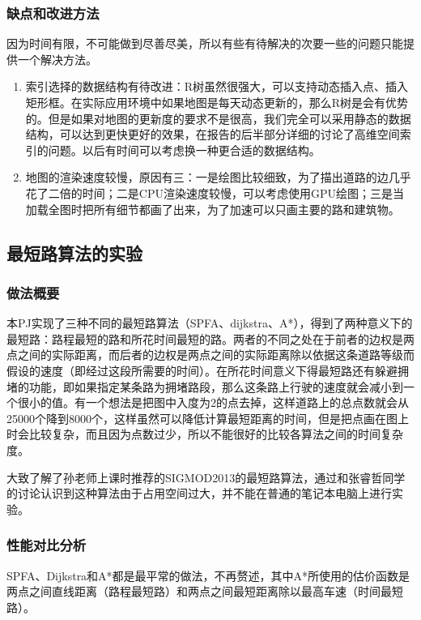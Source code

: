 \documentclass[10pt]{scrartcl}
\begin{document}
\subsubsection{缺点和改进方法}
因为时间有限，不可能做到尽善尽美，所以有些有待解决的次要一些的问题只能提供一个解决方法。
\begin{enumerate}
\item 索引选择的数据结构有待改进：R树虽然很强大，可以支持动态插入点、插入矩形框。在实际应用环境中如果地图是每天动态更新的，那么R树是会有优势的。但是如果对地图的更新度的要求不是很高，我们完全可以采用静态的数据结构，可以达到更快更好的效果，在报告的后半部分详细的讨论了高维空间索引的问题。以后有时间可以考虑换一种更合适的数据结构。
\item 地图的渲染速度较慢，原因有三：一是绘图比较细致，为了描出道路的边几乎花了二倍的时间；二是CPU渲染速度较慢，可以考虑使用GPU绘图；三是当加载全图时把所有细节都画了出来，为了加速可以只画主要的路和建筑物。
\end{enumerate}

\subsection{最短路算法的实验}
\subsubsection{做法概要}

本PJ实现了三种不同的最短路算法（SPFA、dijkstra、A*），得到了两种意义下的最短路：路程最短的路和所花时间最短的路。两者的不同之处在于前者的边权是两点之间的实际距离，而后者的边权是两点之间的实际距离除以依据这条道路等级而假设的速度（即经过这段所需要的时间）。在所花时间意义下得最短路还有躲避拥堵的功能，即如果指定某条路为拥堵路段，那么这条路上行驶的速度就会减小到一个很小的值。有一个想法是把图中入度为2的点去掉，这样道路上的总点数就会从25000个降到8000个，这样虽然可以降低计算最短距离的时间，但是把点画在图上时会比较复杂，而且因为点数过少，所以不能很好的比较各算法之间的时间复杂度。

大致了解了孙老师上课时推荐的SIGMOD2013的最短路算法\cite{DBLP:journals/corr/abs-1304-4661}，通过和张睿哲同学的讨论认识到这种算法由于占用空间过大，并不能在普通的笔记本电脑上进行实验。

\subsubsection{性能对比分析}

SPFA、Dijkstra和A*都是最平常的做法，不再赘述，其中A*所使用的估价函数是两点之间直线距离（路程最短路）和两点之间最短距离除以最高车速（时间最短路）。
\end{document}
